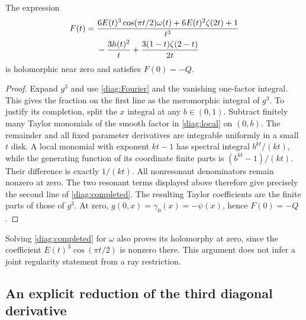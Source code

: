 \begin{lemma}\label{lem:diag-completed}
The expression
\begin{align}
 F(t)={}&\frac{6E(t)^3\cos(\pi t/2)\omega(t)
                         +6E(t)^2\zeta(2t)+1}{t^3}\notag\\
 &-\frac{3h(t)^2}{t}
           +\frac{3(1-t)\zeta(2-t)}{2t}
 \label{diag:completed}
\end{align}
is holomorphic near zero and satisfies $F(0)=-Q$.
\end{lemma}

\begin{proof}
Expand $g^3$ and use \eqref{diag:Fourier} and the vanishing
one-factor integral. This gives the fraction on the first line as
the meromorphic integral of $g^3$. To justify its completion,
split the $x$ integral at any $b\in(0,1)$. Subtract finitely many
Taylor monomials of the smooth factor in \eqref{diag:local} on
$(0,b)$. The remainder and all fixed parameter derivatives are
integrable uniformly in a small $t$ disk. A local monomial with
exponent $kt-1$ has spectral integral $b^{kt}/(kt)$, while the
generating function of its coordinate finite parts is
$(b^{kt}-1)/(kt)$. Their difference is exactly $1/(kt)$.
All nonresonant denominators remain nonzero at zero. The two
resonant terms displayed above therefore give precisely the second
line of \eqref{diag:completed}. The resulting Taylor coefficients
are the finite parts of those of $g^3$. At zero,
$g(0,x)=\gamma_0(x)=-\psi(x)$, hence $F(0)=-Q$.
\end{proof}

Solving \eqref{diag:completed} for $\omega$ also proves its
holomorphy at zero, since the coefficient $E(t)^3\cos(\pi t/2)$
is nonzero there. This argument does not infer a joint regularity
statement from a ray restriction.

\subsection{An explicit reduction of the third diagonal derivative}

